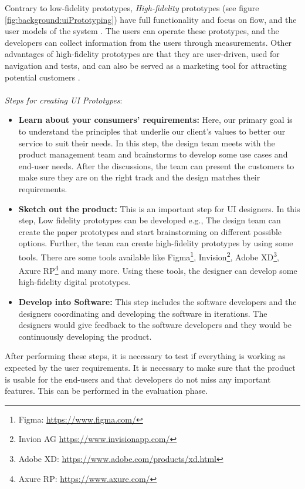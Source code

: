 Contrary to low-fidelity prototypes, \textit{High-fidelity} prototypes (see figure \ref{fig:background:uiPrototyping}) have full functionality and focus on flow, and the user models of the system \cite{article:prototyping:exploratory}.
The users can operate these prototypes, and the developers can collect information from the users through measurements. 
Other advantages of high-fidelity prototypes are that they are user-driven, used for navigation and tests, and can also be served as a marketing tool for attracting potential customers \cite{article:prototyping:highlowfidelity}.\\ \\
\textit{Steps for creating UI Prototypes}:
\begin{itemize}
  \item \textbf{Learn about your consumers' requirements:} Here, our primary goal is to understand the principles that underlie our client's values to better our service to suit their needs. In this step, the design team meets with the product management team and brainstorms to develop some use cases and end-user needs. After the discussions, the team can present the customers to make sure they are on the right track and the design matches their requirements.
  \item \textbf{Sketch out the product:} This is an important step for UI designers. In this step, Low fidelity prototypes can be developed e.g., The design team can create the paper prototypes and start brainstorming on different possible options. Further, the team can create high-fidelity prototypes by using some tools. There are some tools available like Figma\footnote{Figma: \url{https://www.figma.com/}}, Invision\footnote{Invion AG \url{https://www.invisionapp.com/}}, Adobe XD\footnote{Adobe XD: \url{https://www.adobe.com/products/xd.html}}, Axure RP\footnote{Axure RP: \url{https://www.axure.com/}} and many more. Using these tools, the designer can develop some high-fidelity digital prototypes.
  \item \textbf{Develop into Software:} This step includes the software developers and the designers coordinating and developing the software in iterations. The designers would give feedback to the software developers and they would be continuously developing the product.
\end{itemize}

After performing these steps, it is necessary to test if everything is working as expected by the user requirements.
It is necessary to make sure that the product is usable for the end-users and that developers do not miss any important features.
This can be performed in the evaluation phase. 

